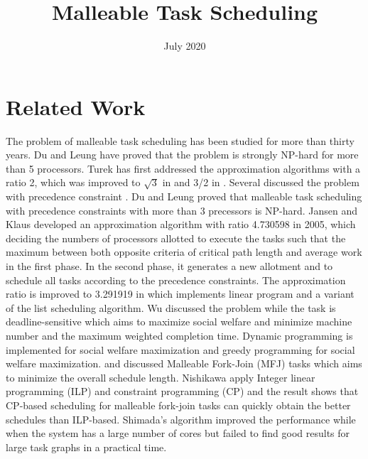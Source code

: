 \documentclass{article}
\author{}
\date{July 2020}
\title{Malleable Task Scheduling}
\begin{document}
    \maketitle
    \section{Related Work}

    The problem of malleable task scheduling has been studied for more than thirty years. Du and Leung 		 
	\cite{du1989complexity} have proved that the problem is strongly NP-hard for more than 5 processors.
	Turek \cite{turek1992approximate} has first addressed the approximation algorithms with a ratio 2,
	which was improved to $\sqrt{3}$ in \cite{mounie1999efficient} and 3/2 in \cite{mounie20023}.
	\newline
	\newline
	Several discussed the problem with precedence constraint \cite{Gunther2009Sep}\cite{Jansen2006Jul}
	\cite{Jansen2012Jan}\cite{Nishikawa2018Nov}. Du and Leung\cite{du1989complexity} proved that malleable 
	task scheduling with precedence constraints with more than 3 precessors is NP-hard. Jansen and Klaus
	\cite{Jansen2006Jul} developed an approximation algorithm with ratio 4.730598 in 2005, which deciding 
	the numbers of processors allotted to execute the tasks such that the maximum between both opposite 
	criteria of critical path length and average work in the first phase. In the second phase, it 
	generates a new allotment and to schedule all tasks according to the precedence constraints.
	The approximation ratio is improved to 3.291919 in \cite{Jansen2012Jan} which implements linear 
	program and a variant of the list scheduling algorithm. Wu \cite{WuXiaohu2015AfSM} discussed the 
	problem while the task is deadline-sensitive which aims to maximize social welfare and minimize 
	machine number and the maximum weighted completion time. Dynamic programming is implemented for 
	social welfare maximization and greedy programming for social welfare maximization.
	\newline
	\newline
	\cite{Nishikawa2018Nov} and \cite{Shimada2019Nov} discussed Malleable Fork-Join (MFJ) tasks which
	aims to minimize the overall schedule length. Nishikawa\cite{Nishikawa2018Nov} apply Integer linear 
	programming (ILP) and constraint programming (CP) and the result shows that CP-based scheduling for 	
	malleable fork-join tasks can quickly obtain the better schedules than ILP-based. Shimada's algorithm 
	\cite{Shimada2019Nov} improved the performance while when the system has a large number of cores
	but failed to find good results for large task graphs in a practical time.
	
	
	
\end{document}
